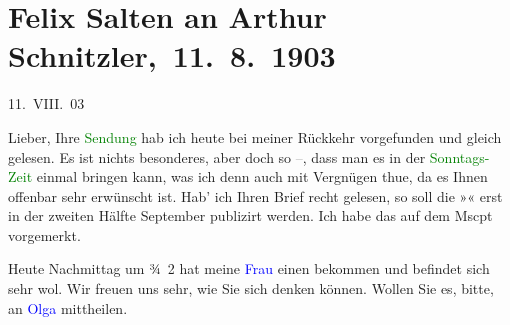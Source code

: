 

\renewcommand{\erwaehntePersonen}{Personen: Emilie Mewes-Béha, Ottilie Salten, Paul Salten, Olga Schnitzler}
\renewcommand{\erwaehnteOrte}{Orte: Wien}
\renewcommand{\erwaehnteWerke}{Werke: Die Zeit, Studie}
\section[ Felix Salten an Arthur Schnitzler, 11. 8. 1903]{Felix Salten an Arthur Schnitzler, 11. 8. 1903}
\nopagebreak{}
\rehead{ }\normalsize\beginnumbering{}
\toendnotes[C]{\smallbreak\pagebreak[2]}
\toendnotes[C]{\smallbreak}
\pstart
           \raggedleft{}{\pb}11. VIII. 03\pend
           
\pstart
           Lieber, Ihre \textcolor{green}{Sendung}{}\ledrightnote{{$\rightarrow$}\textcolor{green}{Studie}} hab ich heute bei meiner Rückkehr
               vorgefunden und gleich gelesen. Es ist nichts besonderes, aber doch so
                  \textcolor{gray}{–}, dass man es in der \textcolor{green}{Sonntags-Zeit}{}\ledrightnote{\textcolor{green}{Die Zeit}} einmal bringen kann, was ich denn auch mit Vergnügen thue, da
               es Ihnen offenbar sehr erwünscht ist. Hab’ ich Ihren Brief recht gelesen, so soll die
                  »\label{K_L03342-1v}\label{K_L03342-1h}« erst in der zweiten Hälfte September publizirt werden. Ich habe das auf dem Mscpt
               vorgemerkt.\pend
           
\pstart
           Heute{ }Nachmittag um ¾ 2 hat meine \textcolor{blue}{Frau}{}\ledrightnote{{$\rightarrow$}\textcolor{blue}{Ottilie Salten}} einen \label{K_L03342-2v}\label{K_L03342-2h} bekommen und befindet sich sehr wol. Wir freuen uns sehr, wie Sie sich denken
               können. Wollen Sie es, bitte, an \textcolor{blue}{Olga}{}\ledrightnote{\textcolor{blue}{Olga Schnitzler}}
               mittheilen.\pend
           
